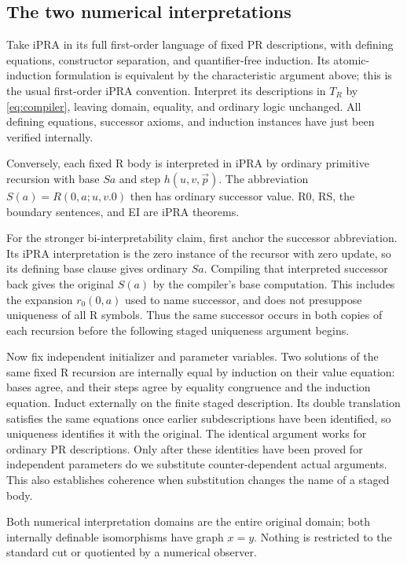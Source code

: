 \subsection{The two numerical interpretations}

Take iPRA in its full first-order language of fixed PR descriptions,
with defining equations, constructor separation, and quantifier-free
induction. Its atomic-induction formulation is equivalent by the
characteristic argument above; this is the usual first-order iPRA
convention\cite{salehi}. Interpret its descriptions in $T_R$ by
\eqref{eq:compiler}, leaving domain, equality, and ordinary logic unchanged.
All defining equations, successor axioms, and induction instances have
just been verified internally.

Conversely, each fixed R body is interpreted in iPRA by ordinary
primitive recursion with base $Sa$ and step $h(u,v,\vec p)$. The
abbreviation $S(a)=R(0,a;u,v.0)$ then has ordinary successor value.
R0, RS, the boundary sentences, and EI are iPRA theorems.

For the stronger bi-interpretability claim, first anchor the successor
abbreviation. Its iPRA interpretation is the zero instance of the
recursor with zero update, so its defining base clause gives ordinary
$Sa$. Compiling that interpreted successor back gives the original
$S(a)$ by the compiler's base computation. This includes the expansion
$r_0(0,a)$ used to name successor, and does not presuppose uniqueness
of all R symbols. Thus the same successor occurs in both copies of each
recursion before the following staged uniqueness argument begins.

Now fix independent initializer and parameter variables. Two solutions
of the same fixed R recursion
are internally equal by induction on their value equation: bases agree,
and their steps agree by equality congruence and the induction equation.
Induct externally on the finite staged description. Its double
translation satisfies the same equations once earlier subdescriptions
have been identified, so uniqueness identifies it with the original.
The identical argument works for ordinary PR descriptions. Only after
these identities have been proved for independent parameters do we
substitute counter-dependent actual arguments. This also establishes
coherence when substitution changes the name of a staged body.

Both numerical interpretation domains are the entire original domain;
both internally definable isomorphisms have graph $x=y$. Nothing is
restricted to the standard cut or quotiented by a numerical observer.

